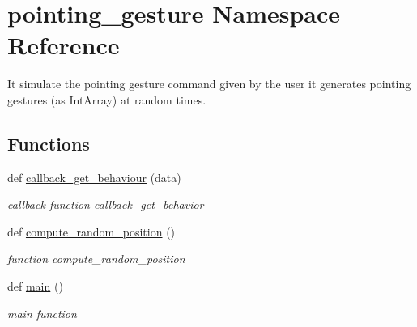 \hypertarget{namespacepointing__gesture}{}\section{pointing\+\_\+gesture Namespace Reference}
\label{namespacepointing__gesture}


It simulate the pointing gesture command given by the user it generates pointing gestures (as Int\+Array) at random times.  


\subsection*{Functions}
\begin{DoxyCompactItemize}
\item 
def \hyperlink{namespacepointing__gesture_a0ccd291e8028504e94f37e49a5411b3d}{callback\+\_\+get\+\_\+behaviour} (data)
\begin{DoxyCompactList}\small\item\em callback function callback\+\_\+get\+\_\+behavior \end{DoxyCompactList}\item 
def \hyperlink{namespacepointing__gesture_a3f243853d60010878f1a2dbbe2338dbd}{compute\+\_\+random\+\_\+position} ()
\begin{DoxyCompactList}\small\item\em function compute\+\_\+random\+\_\+position \end{DoxyCompactList}\item 
def \hyperlink{namespacepointing__gesture_a0246e9d31b3d0b62a01bdb5b697df181}{main} ()
\begin{DoxyCompactList}\small\item\em main function \end{DoxyCompactList}\end{DoxyCompactItemize}
